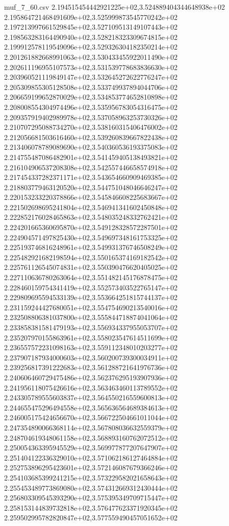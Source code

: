 \begin{filecontents*}{muf_7_60.csv}
2.194515454442921225e+02,3.524889404344648938e+02
2.195864721468491609e+02,3.525999873545770242e+02
2.197213997661529845e+02,3.527109513149107443e+02
2.198563283164490940e+02,3.528218323309674815e+02
2.199912578119549096e+02,3.529326304182350214e+02
2.201261882668991063e+02,3.530433455922011490e+02
2.202611196955107573e+02,3.531539778683836630e+02
2.203960521119849147e+02,3.532645272622776247e+02
2.205309855305128508e+02,3.533749937894044706e+02
2.206659199652870029e+02,3.534853774652810898e+02
2.208008554304974496e+02,3.535956783054316475e+02
2.209357919402989978e+02,3.537058963253730326e+02
2.210707295088734270e+02,3.538160315406476002e+02
2.212056681503616460e+02,3.539260839667822438e+02
2.213406078789089690e+02,3.540360536193375083e+02
2.214755487086482901e+02,3.541459405138493821e+02
2.216104906537208308e+02,3.542557446658574918e+02
2.217454337282371171e+02,3.543654660909469385e+02
2.218803779463120520e+02,3.544751048046646247e+02
2.220153233220378866e+02,3.545846608225683667e+02
2.221502698695241804e+02,3.546941341602450848e+02
2.222852176028465863e+02,3.548035248332762421e+02
2.224201665360695870e+02,3.549128328572287501e+02
2.224904571497825430e+02,3.549697348161753325e+02
2.225193746816248961e+02,3.549931376746508249e+02
2.225482921682198594e+02,3.550165374169182542e+02
2.225761126545074831e+02,3.550390476620405025e+02
2.227110636780263064e+02,3.551482145176878475e+02
2.228460159754341419e+02,3.552573403522765147e+02
2.229809695594533139e+02,3.553664251815744137e+02
2.231159244427680051e+02,3.554754690213540016e+02
2.232508806381037800e+02,3.555844718874041064e+02
2.233858381581479193e+02,3.556934337955053707e+02
2.235207970155863961e+02,3.558023547614511699e+02
2.236557572231098163e+02,3.559112348010203277e+02
2.237907187934000603e+02,3.560200739300034911e+02
2.239256817391222683e+02,3.561288721641976736e+02
2.240606460729475486e+02,3.562376295193907936e+02
2.241956118075426616e+02,3.563463460113789552e+02
2.243305789555603837e+02,3.564550216559600813e+02
2.244655475296494558e+02,3.565636564689384613e+02
2.246005175424656670e+02,3.566722504661011044e+02
2.247354890066368114e+02,3.567808036632559379e+02
2.248704619348061158e+02,3.568893160762072512e+02
2.250054363395945529e+02,3.569977877207647907e+02
2.251404122336329010e+02,3.571062186127464884e+02
2.252753896295423601e+02,3.572146087679366246e+02
2.254103685399241215e+02,3.573229582021658643e+02
2.255453489773869080e+02,3.574312669312430444e+02
2.256803309545393290e+02,3.575395349709715447e+02
2.258153144839732818e+02,3.576477623371920345e+02
2.259502995782820847e+02,3.577559490457051652e+02

\end{filecontents*}
